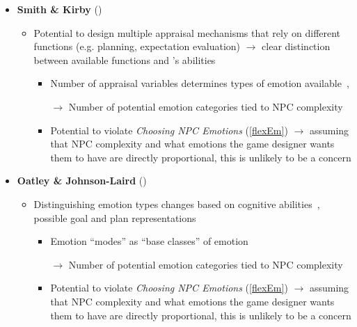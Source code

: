 \begin{itemize}
    \item \textbf{Smith \& Kirby} (\strong)
    \begin{itemize}
        \item Potential to design multiple appraisal mechanisms that rely
        on different functions (e.g. planning, expectation evaluation)
        $\rightarrow$ clear distinction between available functions and
        \progname{}'s abilities
        \begin{itemize}
            \item Number of appraisal variables determines types of emotion
            available~\citep{yih2016distinct, yih2016patterns},
            \citep[p.~488--492]{yih2020profiles}

            \item [$\rightarrow$] Number of potential emotion categories tied
            to NPC complexity

            \item Potential to violate \textit{Choosing NPC Emotions}
            (\ref{flexEm}) $\rightarrow$ assuming that NPC complexity and what
            emotions the game designer wants them to have are directly
            proportional, this is unlikely to be a concern
        \end{itemize}
    \end{itemize}

    \item \textbf{Oatley \& Johnson-Laird} (\good)
    \begin{itemize}
        \item Distinguishing emotion types changes based on cognitive
        abilities~\citep[p.~40--41]{oatley1987towards}, possible goal and plan
        representations~\citep[p.~57--58]{oatley1992best}
        \begin{itemize}
            \item Emotion ``modes'' as ``base classes'' of emotion

            \item [$\rightarrow$] Number of potential emotion categories tied
            to NPC complexity

            \item Potential to violate \textit{Choosing NPC Emotions}
            (\ref{flexEm}) $\rightarrow$ assuming that NPC complexity and what
            emotions the game designer wants them to have are directly
            proportional, this is unlikely to be a concern
        \end{itemize}
    \end{itemize}
\end{itemize}

